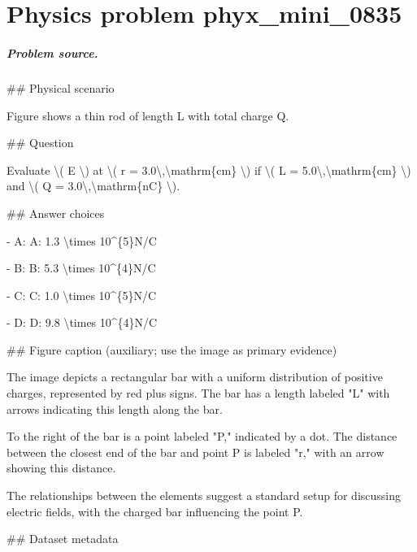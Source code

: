 
\chapter{Physics problem phyx\_mini\_0835}
\label{ch:PhyXMiniProblems_problem_phyx_mini_0835}

\paragraph{Problem source.}
\#\# Physical scenario

Figure shows a thin rod of length L with total charge Q.

\#\# Question

Evaluate \textbackslash{}( E \textbackslash{}) at \textbackslash{}( r = 3.0\textbackslash{},\textbackslash{}mathrm\{cm\} \textbackslash{}) if \textbackslash{}( L = 5.0\textbackslash{},\textbackslash{}mathrm\{cm\} \textbackslash{}) and \textbackslash{}( Q = 3.0\textbackslash{},\textbackslash{}mathrm\{nC\} \textbackslash{}).

\#\# Answer choices

- A: A: 1.3 \textbackslash{}times 10\textasciicircum{}\{5\}N/C

- B: B: 5.3 \textbackslash{}times 10\textasciicircum{}\{4\}N/C

- C: C: 1.0 \textbackslash{}times 10\textasciicircum{}\{5\}N/C

- D: D: 9.8 \textbackslash{}times 10\textasciicircum{}\{4\}N/C

\#\# Figure caption (auxiliary; use the image as primary evidence)

The image depicts a rectangular bar with a uniform distribution of positive charges, represented by red plus signs. The bar has a length labeled "L" with arrows indicating this length along the bar.

To the right of the bar is a point labeled "P," indicated by a dot. The distance between the closest end of the bar and point P is labeled "r," with an arrow showing this distance.

The relationships between the elements suggest a standard setup for discussing electric fields, with the charged bar influencing the point P.

\#\# Dataset metadata

